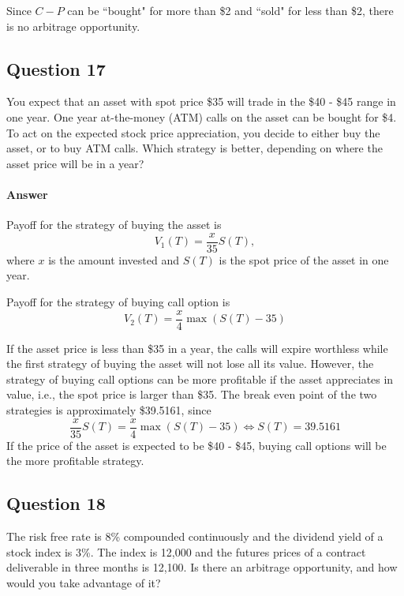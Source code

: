 Since $ C - P $ can be ``bought" for more than \$2 and ``sold" for less than
    \$2, there is no arbitrage opportunity.

\subsection{Question 17}
You expect that an asset with spot price \$35 will trade in the \$40 - \$45
    range in one year.
One year at-the-money (ATM) calls on the asset can be bought for \$4.
To act on the expected stock price appreciation, you decide to either buy the
    asset, or to buy ATM calls.
Which strategy is better, depending on where the asset price will be in a year?

\paragraph{Answer}
Payoff for the strategy of buying the asset is
\begin{equation*}
    V_1(T) = \frac{x}{35} S(T),
\end{equation*}
where $ x $ is the amount invested and $ S(T) $ is the spot price of the asset
    in one year.

Payoff for the strategy of buying call option is
\begin{equation*}
    V_2(T) = \frac{x}{4} \max (S(T) - 35)
\end{equation*}

If the asset price is less than \$35 in a year, the calls will expire worthless
    while the first strategy of buying the asset will not lose all its value.
However, the strategy of buying call options can be more profitable if the
    asset appreciates in value, i.e., the spot price is larger than \$35.
The break even point of the two strategies is approximately \$39.5161, since
\begin{equation*}
    \frac{x}{35} S(T) = \frac{x}{4} \max (S(T) - 35) \Leftrightarrow
        S(T) = 39.5161
\end{equation*}
If the price of the asset is expected to be \$40 - \$45, buying call options
    will be the more profitable strategy.

\subsection{Question 18}
The risk free rate is 8\% compounded continuously and the dividend yield of a
    stock index is 3\%.
The index is 12,000 and the futures prices of a contract deliverable in three
    months is 12,100.
Is there an arbitrage opportunity, and how would you take advantage of it?

